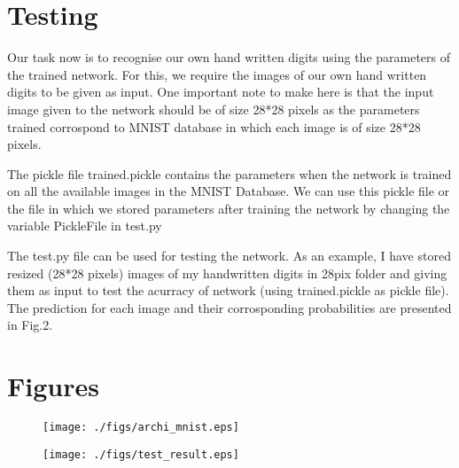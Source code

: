 \documentclass[journal,12pt,twocolumn]{IEEEtran}
\begin{document}
\section{Testing}
Our task now is to recognise our own hand written digits using the parameters of the trained network. For this, we require the images of our own hand written digits to be given as input. One important note to make here is that the input image given to the network should be of size 28*28 pixels as the parameters trained corrospond to MNIST database in which each image is of size 28*28 pixels.

The pickle file trained.pickle contains the parameters when the network is trained on all the available images in the MNIST Database. We can use this pickle file or the file in which we stored parameters after training the network by changing the variable PickleFile in test.py

The test.py file can be used for testing the network. As an example, I have stored resized (28*28 pixels) images of my handwritten digits in 28pix folder and giving them as input to test the acurracy of network (using trained.pickle as pickle file). The prediction for each image and their corrosponding probabilities are presented in Fig.2. 

\section{Figures}
\begin{figure}[!h]
\begin{center}
\texttt{[image: ./figs/archi\_mnist.eps]}
\end{center}
\caption{}
\label{fig:cnn_archi}
\end{figure}

\begin{figure}[!h]
\begin{center}
\texttt{[image: ./figs/test\_result.eps]}
\end{center}
\caption{}
\label{fig:results}
\end{figure}
\end{document}
